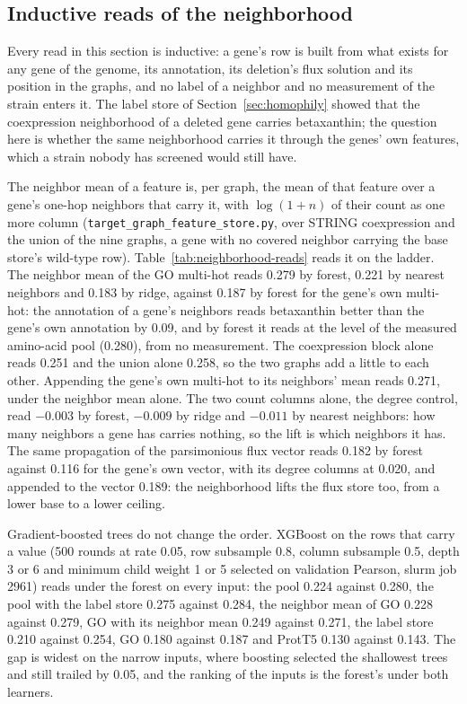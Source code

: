 


\subsection{Inductive reads of the neighborhood}
\label{sec:inductive}

Every read in this section is inductive: a gene's row is built from what exists for any
gene of the genome, its annotation, its deletion's flux solution and its position in
the graphs, and no label of a neighbor and no measurement of the strain enters it. The
label store of Section~\ref{sec:homophily} showed that the coexpression neighborhood of
a deleted gene carries betaxanthin; the question here is whether the same neighborhood
carries it through the genes' own features, which a strain nobody has screened would
still have.

The neighbor mean of a feature is, per graph, the mean of that feature over a gene's
one-hop neighbors that carry it, with $\log(1 + n)$ of their count as one more column
(\texttt{target\_graph\_feature\_store.py}, over STRING coexpression and the union of
the nine graphs, a gene with no covered neighbor carrying the base store's wild-type
row). Table~\ref{tab:neighborhood-reads} reads it on the ladder. The neighbor mean of
the GO multi-hot reads 0.279 by forest, 0.221 by nearest neighbors and 0.183 by ridge,
against 0.187 by forest for the gene's own multi-hot: the annotation of a gene's
neighbors reads betaxanthin better than the gene's own annotation by 0.09, and by
forest it reads at the level of the measured amino-acid pool (0.280), from no
measurement. The coexpression block alone reads 0.251 and the union alone 0.258, so
the two graphs add a little to each other. Appending the gene's own multi-hot to its
neighbors' mean reads 0.271, under the neighbor mean alone. The two count columns
alone, the degree control, read $-0.003$ by forest, $-0.009$ by ridge and $-0.011$ by
nearest neighbors: how many neighbors a gene has carries nothing, so the lift is which
neighbors it has. The same propagation of the parsimonious flux vector reads 0.182 by
forest against 0.116 for the gene's own vector, with its degree columns at 0.020, and
appended to the vector 0.189: the neighborhood lifts the flux store too, from a lower
base to a lower ceiling.

Gradient-boosted trees do not change the order. XGBoost on the rows that carry a value
(500 rounds at rate 0.05, row subsample 0.8, column subsample 0.5, depth 3 or 6 and
minimum child weight 1 or 5 selected on validation Pearson, slurm job 2961) reads under
the forest on every input: the pool 0.224 against 0.280, the pool with the label store
0.275 against 0.284, the neighbor mean of GO 0.228 against 0.279, GO with its neighbor
mean 0.249 against 0.271, the label store 0.210 against 0.254, GO 0.180 against 0.187
and ProtT5 0.130 against 0.143. The gap is widest on the narrow inputs, where boosting
selected the shallowest trees and still trailed by 0.05, and the ranking of the inputs
is the forest's under both learners.

